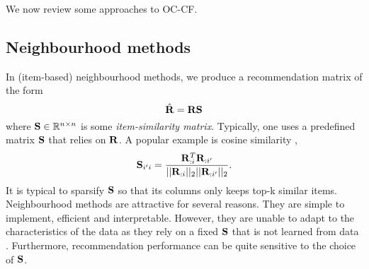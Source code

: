 
We now review some approaches to OC-CF.
%
\subsection{Neighbourhood methods}
\label{sec:knn}

In (item-based) neighbourhood methods, we produce a recommendation matrix of the form
\begin{equation}
\label{eqn:knn}
\hat{\mathbf{R}} = \mathbf{R} \mathbf{S}
\end{equation}
where $\mathbf{S} \in \mathbb{R}^{n \times n}$ is some \emph{item-similarity matrix}.
Typically, one uses a predefined matrix $\mathbf{S}$ that relies on $\mathbf{R}$. A popular example is cosine similarity \citep{Sarwar:2001, Linden:2003}, 
$$ \mathbf{S}_{i' i} = \frac{ \mathbf{R}_{:i}^T \mathbf{R}_{:i'} }{|| \mathbf{R}_{:i} ||_2 || \mathbf{R}_{:i'} ||_2}. $$
It is typical to sparsify $\mathbf{S}$ so that its columns only keeps top-k similar items. 
Neighbourhood methods are attractive for several reasons.
They are simple to implement, efficient 
and interpretable.
However, they are unable to adapt to the characteristics of the data as they rely on a fixed $\mathbf{S}$ that is not learned from data \citep{Koren:2008b}. Furthermore, recommendation performance can be quite sensitive to the choice of $\mathbf{S}$.

